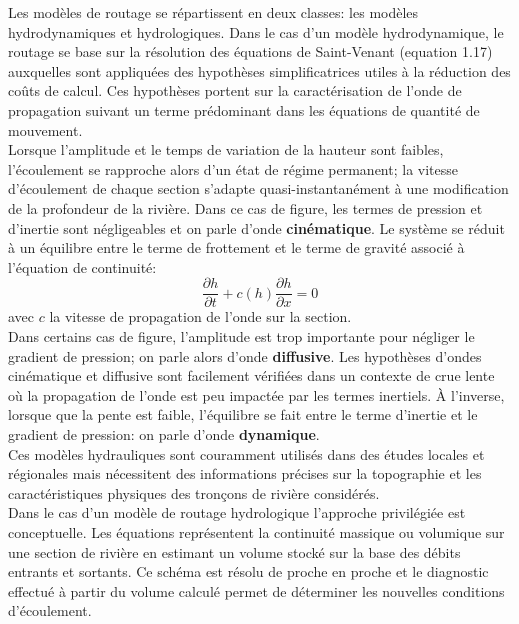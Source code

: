 Les modèles de routage se répartissent en deux classes: les modèles hydrodynamiques et hydrologiques. Dans le cas d'un modèle hydrodynamique, le routage se base sur la résolution des équations de Saint-Venant (equation 1.17) auxquelles sont appliquées des hypothèses simplificatrices utiles à la réduction des coûts de calcul. Ces hypothèses portent sur la caractérisation de l'onde de propagation suivant un terme prédominant dans les équations de quantité de mouvement. \\

Lorsque l'amplitude et le temps de variation de la hauteur sont faibles, l'écoulement se rapproche alors d'un état de régime permanent; la vitesse d'écoulement de chaque section s'adapte quasi-instantanément à une modification de la profondeur de la rivière. Dans ce cas de figure, les termes de pression et d'inertie sont négligeables et on parle d'onde \textbf{cinématique}. Le système se réduit à un équilibre entre le terme de frottement et le terme de gravité associé à l'équation de continuité:
\begin{equation}
\frac{\partial h}{\partial t} + c(h) \frac{\partial h}{\partial x}=0
\end{equation}
avec $c$ la vitesse de propagation de l'onde sur la section.\\

Dans certains cas de figure, l'amplitude est trop importante pour négliger le gradient de pression; on parle alors d'onde \textbf{diffusive}. Les hypothèses d'ondes cinématique et diffusive sont facilement vérifiées dans un contexte de crue lente où la propagation de l'onde est peu impactée par les termes inertiels. À l'inverse, lorsque que la pente est faible, l'équilibre se fait entre le terme d'inertie et le gradient de pression: on parle d'onde \textbf{dynamique}.\\
Ces modèles hydrauliques sont couramment utilisés dans des études locales et régionales mais nécessitent des informations précises sur la topographie et les caractéristiques physiques des tronçons de rivière considérés.\\

Dans le cas d'un modèle de routage hydrologique l'approche privilégiée est conceptuelle. Les équations représentent la continuité massique ou volumique sur une section de rivière en estimant un volume stocké sur la base des débits entrants et sortants. Ce schéma est résolu de proche en proche et le diagnostic effectué à partir du volume calculé permet de déterminer les nouvelles conditions d'écoulement.\\

